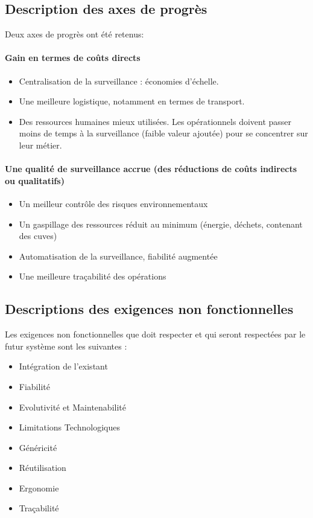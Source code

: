 \documentclass[a4paper]{article}
\begin{document}
\subsection{Description des axes de progrès}

Deux axes de progrès ont été retenus:

\paragraph{Gain en termes de coûts directs}

\begin{itemize}
\item Centralisation de la surveillance : économies d'échelle.
\item Une meilleure logistique, notamment en termes de transport.
\item Des ressources humaines mieux utilisées. Les opérationnels doivent passer moins de temps à la surveillance (faible valeur ajoutée) pour se concentrer sur leur métier.
\end{itemize}

\paragraph{Une qualité de surveillance accrue (des réductions de coûts indirects ou qualitatifs)}

\begin{itemize}
\item Un meilleur contrôle des risques environnementaux
\item Un gaspillage des ressources réduit au minimum (énergie, déchets, contenant des cuves)
\item Automatisation de la surveillance, fiabilité augmentée
\item Une meilleure traçabilité des opérations
\end{itemize}

\subsection{Descriptions des exigences non fonctionnelles}

Les exigences non fonctionnelles que doit respecter et qui seront respectées par le futur système sont les suivantes :

\begin{itemize}
\item Intégration de l'existant
\item Fiabilité
\item Evolutivité et Maintenabilité
\item Limitations Technologiques
\item Généricité
\item Réutilisation
\item Ergonomie
\item Traçabilité
\end{itemize}
\end{document}

